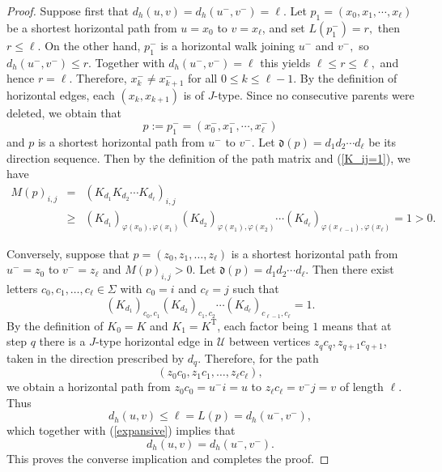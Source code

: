 \documentclass[reqno]{amsart}
\theoremstyle{plain}
\numberwithin{equation}{section}
\begin{document}
\begin{proof}
Suppose first that $d_{h}(u,v)=d_{h}(u^{-},v^{-})=\ell .$ Let $%
p_{1}=(x_{0},x_{1},\cdots ,x_{\ell })$ be a shortest horizontal path from $%
u=x_{0}$ to $v=x_{\ell }$, and set $L(p_{1}^{-})=r,$ then $r\leq \ell .$ On
the other hand, $p_{1}^{-}$ is a horizontal walk joining $u^{-}$ and $v^{-},$
so $d_{h}(u^{-},v^{-})\leq r.$ Together with $d_{h}(u^{-},v^{-})=\ell $ this
yields $\ell \leq r\leq \ell ,$ and hence $r=\ell .$ Therefore, $%
x_{k}^{-}\neq x_{k+1}^{-}$ for all $0\leq k\leq \ell -1.$ By the definition
of horizontal edges, each $(x_{k},x_{k+1})$ is of $J$-type. Since no
consecutive parents were deleted, we obtain that 
\begin{equation*}
p:=p_{1}^{-}=(x_{0}^{-},x_{1}^{-},\cdots ,x_{\ell }^{-})
\end{equation*}%
and $p$ is a shortest horizontal path from $u^{-}$ to $v^{-}$. Let $%
\mathfrak{d}(p)=d_{1}d_{2}\cdots d_{\ell }$ be its direction sequence. Then
by the definition of the path matrix and (\ref{K_ij=1}), we have 
\begin{eqnarray*}
M(p)_{i,j} &=&(K_{d_{1}}K_{d_{2}}\cdots K_{d_{\ell }})_{i,j} \\
&\geq &(K_{d_{1}})_{\varphi (x_{0}),\varphi (x_{1})}(K_{d_{2}})_{\varphi
(x_{1}),\varphi (x_{2})}\cdots (K_{d_{\ell }})_{\varphi (x_{\ell
-1}),\varphi (x_{\ell })}=1>0.
\end{eqnarray*}

Conversely, suppose that $p=(z_{0},z_{1},\ldots ,z_{\ell })$ is a shortest
horizontal path from $u^{-}=z_{0}$ to $v^{-}=z_{\ell }$ and $M(p)_{i,j}>0$.
Let $\mathfrak{d}(p)=d_{1}d_{2}\cdots d_{\ell }$. Then there exist letters $%
c_{0},c_{1},\dots ,c_{\ell }\in \Sigma $ with $c_{0}=i$ and $c_{\ell }=j$
such that 
\begin{equation*}
(K_{d_{1}})_{c_{0},c_{1}}(K_{d_{2}})_{c_{1},c_{2}}\cdots (K_{d_{\ell
}})_{c_{\ell -1},c_{\ell }}=1.
\end{equation*}%
By the definition of $K_{0}=K$ and $K_{1}=K^{\mathrm{T}}$, each factor being 
$1$ means that at step $q$ there is a $J$-type horizontal edge in $\mathcal{U%
}$ between vertices $z_{q}c_{q},z_{q+1}c_{q+1}$, taken in the direction
prescribed by $d_{q}$. Therefore, for the path 
\begin{equation*}
(z_{0}c_{0},z_{1}c_{1},\dots ,z_{\ell }c_{\ell }),
\end{equation*}%
we obtain a horizontal path from $z_{0}c_{0}=u^{-}i=u$ to $z_{\ell }c_{\ell
}=v^{-}j=v$ of length $\ell $. Thus 
\begin{equation*}
d_{h}(u,v)\leq \ell =L(p)=d_{h}(u^{-},v^{-}),
\end{equation*}%
which together with (\ref{expansive}) implies that%
\begin{equation*}
d_{h}(u,v)=d_{h}(u^{-},v^{-}).
\end{equation*}%
This proves the converse implication and completes the proof.
\end{proof}
\end{document}
